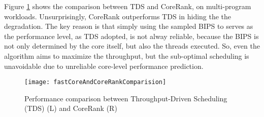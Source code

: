 Figure \ref{compheteroaware} shows the comparison between TDS and CoreRank, on multi-program workloads.  Unsurprisingly, CoreRank outperforms TDS in hiding the the degradation. The key reason is that simply using the sampled BIPS to serves as the performance level, as TDS adopted,  is not alway reliable, because the BIPS is not only determined by the core itself, but also the threads executed. So, even the algorithm aims to maximize the throughput, but the sub-optimal scheduling is unavoidable due to unreliable core-level performance prediction.    


\begin{figure}[t]
 \centering
  \texttt{[image: fastCoreAndCoreRankComparision]}\\
\caption{Performance comparison between Throughput-Driven Scheduling (TDS) (L) and  CoreRank (R)}
\label{compheteroaware}
\end{figure}







